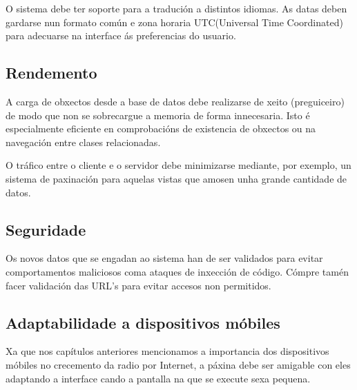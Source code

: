 O sistema debe ter soporte para a tradución a distintos idiomas. As datas deben gardarse nun formato común e zona horaria UTC(Universal Time Coordinated) para adecuarse na interface ás preferencias do usuario.

\subsection{Rendemento}

A carga de obxectos desde a base de datos debe realizarse de xeito  (preguiceiro) de modo que non se sobrecargue a memoria de forma innecesaria. Isto é especialmente eficiente en comprobacións de existencia de obxectos ou na navegación entre clases relacionadas. 

O tráfico entre o cliente e o servidor debe minimizarse mediante, por exemplo, un sistema de paxinación para aquelas vistas que amosen unha grande cantidade de datos.

\subsection{Seguridade}

Os novos datos que se engadan ao sistema han de ser validados para evitar comportamentos maliciosos coma ataques de inxección de código. Cómpre tamén facer validación das URL's para evitar accesos non permitidos. 

\subsection{Adaptabilidade a dispositivos móbiles}

Xa que nos capítulos anteriores mencionamos a importancia dos dispositivos móbiles no crecemento da radio por Internet, a páxina debe ser amigable con eles adaptando a interface cando a pantalla na que se execute sexa pequena.
